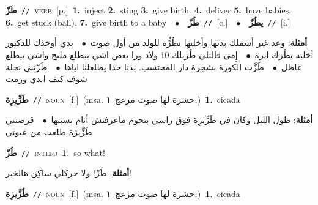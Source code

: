 \documentclass[10pt,a4paper,twoside]{article} %
\begin{document}
\begin{multicols}{2}
{\setlength\topsep{0pt}\textbf{\foreignlanguage{arabic}{طَزّ}}\ {\color{gray}\texttt{//}\color{black}}\ \textsc{verb}\ [p.]\ \textbf{1.}~inject  \textbf{2.}~sting  \textbf{3.}~give birth.  \textbf{4.}~deliver  \textbf{5.}~have babies.  \textbf{6.}~get stuck (ball).  \textbf{7.}~give birth to a baby\ \ $\bullet$\ \ \setlength\topsep{0pt}\textbf{\foreignlanguage{arabic}{طُزّ}}\ {\color{gray}\texttt{//}\color{black}}\ [c.]\ \ $\bullet$\ \ \setlength\topsep{0pt}\textbf{\foreignlanguage{arabic}{يطُزّ}}\ {\color{gray}\texttt{//}\color{black}}\ [i.]\  \begin{flushright}\color{gray}\foreignlanguage{arabic}{\textbf{\underline{\foreignlanguage{arabic}{أمثلة}}}: وعد غير أسملك بدنها وأخليها تطُزُّه للولد من أول صوت\ $\bullet$\ \  بدي أوخذك للدكتور أخليه يطُزك ابرة\ $\bullet$\ \  إِمي قالتلي طُزيلك 10 ولاد ورا بعض اشي بيطلع مليح واشي بيطلع عاطل\ $\bullet$\ \  طَزَّت الكورة بشجرة دار المحتسب. بدنا حدا يطلعلنا اياها\ $\bullet$\ \  طَزّتني نحلة شوف كيف ايدي ورمت}\end{flushright}\color{black}} \vspace{2mm}

{\setlength\topsep{0pt}\textbf{\foreignlanguage{arabic}{طَزِّيزِة}}\ {\color{gray}\texttt{//}\color{black}}\ \textsc{noun}\ [f.]\ \color{gray}(msa. \foreignlanguage{arabic}{حشرة لها صوت مزعج}~\foreignlanguage{arabic}{\textbf{١.}})\color{black}\ \textbf{1.}~cicada\  \begin{flushright}\color{gray}\foreignlanguage{arabic}{\textbf{\underline{\foreignlanguage{arabic}{أمثلة}}}: طول الليل وكان في طَزِّيزِة فوق راسي بتحوم ماعرفتش أنام بسببها\ $\bullet$\ \  قرصتني طَزِّيزَة طلعت من عيوني}\end{flushright}\color{black}} \vspace{2mm}

{\setlength\topsep{0pt}\textbf{\foreignlanguage{arabic}{طُزّ}}\ {\color{gray}\texttt{//}\color{black}}\ \textsc{interj}\ \textbf{1.}~so what!\  \begin{flushright}\color{gray}\foreignlanguage{arabic}{\textbf{\underline{\foreignlanguage{arabic}{أمثلة}}}: طُزْ! ولا حركلي ساكِن هالخبر!}\end{flushright}\color{black}} \vspace{2mm}

{\setlength\topsep{0pt}\textbf{\foreignlanguage{arabic}{طُزَّيزِة}}\ {\color{gray}\texttt{//}\color{black}}\ \textsc{noun}\ [f.]\ \color{gray}(msa. \foreignlanguage{arabic}{حشرة لها صوت مزعج}~\foreignlanguage{arabic}{\textbf{١.}})\color{black}\ \textbf{1.}~cicada\ } \vspace{2mm}


\end{multicols}
\end{document}
